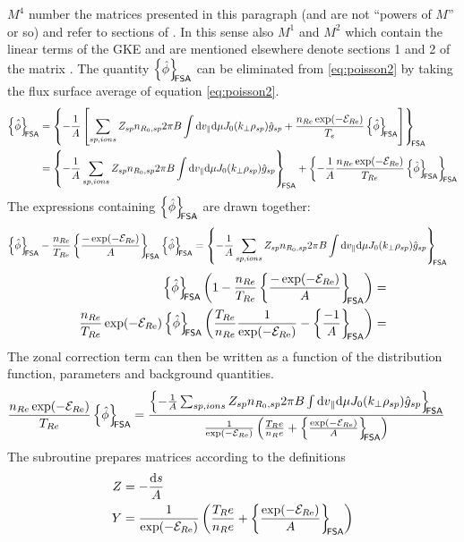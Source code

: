 $M^4$ number the matrices presented in this paragraph (and are not
``powers of $M$'' or so) and refer to sections of . In this
sense also $M^1$ and $M^2$ which contain the linear terms of the GKE
and are mentioned elsewhere denote sections 1 and 2 of the matrix
. The quantity $\left\{ \hat\phi\right\}_{\!\!\text{\textsf{FSA}}}$ can be eliminated from
\ref{eq:poisson2} by taking the flux surface average of equation
\ref{eq:poisson2}.  
\ifmoredetails
\begin{align}
\fsa{\hat{\phi}} &= \fsa{-{1 \over A} \left[ 
    \sum_{sp , ions }  Z_{sp} n_{R_0,sp} 2 \pi B \int {\rm d} v_{\parallel} {\rm d} \mu J_0(k_\perp\rho_{sp}) \hat g_{sp} 
    + {n_{Re}\exp(-\cfennsp{e}) \over T_{e}} \fsa{\hat \phi}
  \right]} \nonumber\\
 &= \fsa{-{1 \over A} 
    \sum_{sp , ions }  Z_{sp} n_{R_0,sp} 2 \pi B \int {\rm d} v_{\parallel} {\rm d} \mu J_0(k_\perp\rho_{sp}) \hat g_{sp} 
    }
    + \fsa{-{1 \over A}{n_{Re}\exp(-\cfennsp{e}) \over T_{Re}} \fsa{\hat \phi}  
}
\end{align}
The expressions containing $\left\{ \hat\phi\right\}_{\!\!\text{\textsf{FSA}}}$ are drawn together:
\begin{align}
\fsa{\hat\phi} - \frac{n_{Re}}{T_{Re}}\fsa{\frac{-\exp(-\cfennsp{e})}{A}} \fsa{\hat \phi}
  &= \fsa{-{1 \over A} 
    \sum_{sp , ions }  Z_{sp} n_{R_0,sp} 2 \pi B \int {\rm d} v_{\parallel} {\rm d} \mu J_0(k_\perp\rho_{sp}) \hat g_{sp} 
}\nonumber
\end{align}
\begin{align}
\fsa{\hat\phi}\left(
  1
  -
  \frac{n_{Re}}{T_{Re}}\fsa{\frac{-\exp(-\cfennsp{e})}{A}}\right)
  &=\nonumber\\
\frac{n_{Re}}{T_{Re}}\exp(-\cfennsp{e})\fsa{\hat\phi}\left(
  \frac{T_{Re}}{n_{Re}}\frac{1}{\exp(-\cfennsp{e})}
  -
  \fsa{\frac{-1}{A}}\right)
  &=
\end{align}
\fi
The zonal correction term can then be written as a function of the
distribution function, parameters and background quantities.
\begin{align}
{n_{Re}\exp(-\mathcal{E}_{R{\rm e}}) \over T_{Re} } \left\{ \hat\phi\right\}_{\!\!\text{\textsf{FSA}}}
&= { \left\{ 
-{1 \over A} \sum_{sp, ions}  Z_{sp} n_{R_0,sp} 2 \pi B \int {\rm d} v_{\parallel} {\rm d} \mu J_0(k_\perp\rho_{sp})\hat g_{sp}
\right\}_{\!\!\text{\textsf{FSA}}}
 \over
 {1 \over \exp(-\mathcal{E}_{R{\rm e}})} \left({T_Re \over n_Re} + \left\{ {\exp(-\mathcal{E}_{R{\rm e}}) \over A}\right\}_{\!\!\text{\textsf{FSA}}}\right)} 
\label{eq:zonal}
\end{align}
The subroutine  prepares matrices according to the definitions
\begin{align}
  Z &= -\frac{\mathrm{d} s}{A} \\
  Y &= \frac{1}{\exp(-\mathcal{E}_{R{\rm e}})} \left({T_Re \over n_Re} + \left\{ {\exp(-\mathcal{E}_{R{\rm e}}) \over A}\right\}_{\!\!\text{\textsf{FSA}}}\right)
\end{align}
